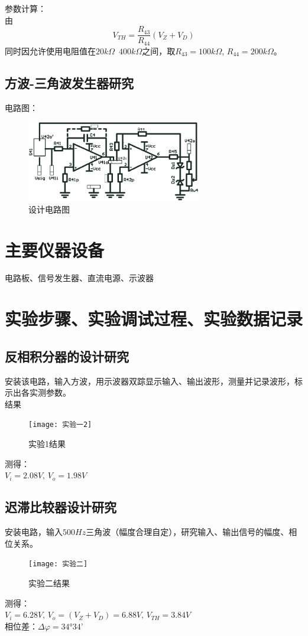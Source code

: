\documentclass{../source/Experiment}
\begin{document}
            参数计算：\\
            由
            $$V_{TH} = \frac{R_{43}}{R_{44}}(V_Z + V_D)$$
            同时因允许使用电阻值在$20k\Omega$~$400k\Omega$之间，取$R_{43} = 100k\Omega,\, R_{44} = 200k\Omega$。
        \subsection{方波-三角波发生器研究}
            电路图：\\
            \begin{figure}[h]
                \centering
                \includegraphics[width = 3in]{pic/集成1}
                \caption{设计电路图}
            \end{figure}
    \section{主要仪器设备}
        电路板、信号发生器、直流电源、示波器
    \section{实验步骤、实验调试过程、实验数据记录}
        \subsection{反相积分器的设计研究}
            安装该电路，输入方波，用示波器双踪显示输入、输出波形，测量并记录波形，标示出各实测参数。\\
            结果
            \begin{figure}[h]
                \centering
                \texttt{[image: 实验一2]}
                \caption{实验1结果}
            \end{figure}
            测得：\\
            $V_i = 2.08V,\, V_o = 1.98V$
        \subsection{迟滞比较器设计研究}
            安装电路，输入$500Hz$三角波（幅度合理自定），研究输入、输出信号的幅度、相位关系。
            \begin{figure}[h]
                \centering
                \texttt{[image: 实验二]}
                \caption{实验二结果}
            \end{figure}
            测得：\\
            $V_i = 6.28V,\, V_o =  (V_Z+V_D) = 6.88V,\, V_{TH} = 3.84V$ \\
            相位差：$\Delta \varphi = 34°34’$
\end{document}
